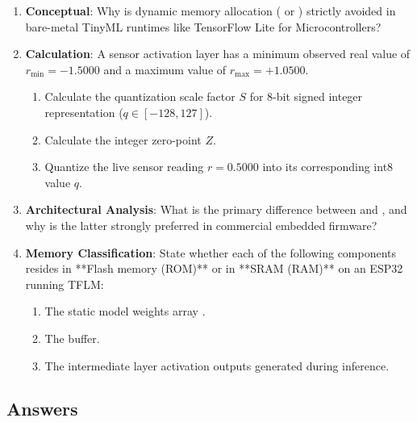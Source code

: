 \begin{checkyourself}
\begin{enumerate}
    \item \textbf{Conceptual}: Why is dynamic memory allocation ( or ) strictly avoided in bare-metal TinyML runtimes like TensorFlow Lite for Microcontrollers?
    \item \textbf{Calculation}: A sensor activation layer has a minimum observed real value of $r_{\min} = -1.5000$ and a maximum value of $r_{\max} = +1.0500$. 
    \begin{enumerate}
        \item Calculate the quantization scale factor $S$ for 8-bit signed integer representation ($q \in [-128, 127]$).
        \item Calculate the integer zero-point $Z$.
        \item Quantize the live sensor reading $r = 0.5000$ into its corresponding int8 value $q$.
    \end{enumerate}
    \item \textbf{Architectural Analysis}: What is the primary difference between  and , and why is the latter strongly preferred in commercial embedded firmware?
    \item \textbf{Memory Classification}: State whether each of the following components resides in **Flash memory (ROM)** or in **SRAM (RAM)** on an ESP32 running TFLM:
    \begin{enumerate}
        \item The static model weights array .
        \item The  buffer.
        \item The intermediate layer activation outputs generated during inference.
    \end{enumerate}
\end{enumerate}
\end{checkyourself}

\subsection*{Answers}

